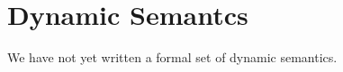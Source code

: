 \section{Dynamic Semantcs}
\label{sec:semantics}

We have not yet written a formal set of dynamic semantics.
